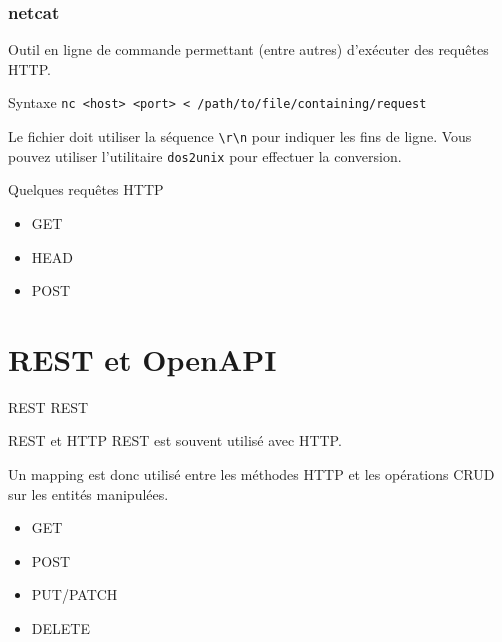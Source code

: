 \documentclass{beamer}
\begin{document}
\begin{frame}[fragile]
  \frametitle{netcat}
  Outil en ligne de commande permettant (entre autres) d'exécuter des requêtes HTTP.

  \begin{alertblock}{Syntaxe}
    \verb+nc <host> <port> < /path/to/file/containing/request+
  \end{alertblock}

  Le fichier doit utiliser la séquence \verb+\r\n+ pour indiquer les fins de ligne. Vous pouvez utiliser l'utilitaire \verb+dos2unix+ pour effectuer la conversion.
\end{frame}

\begin{frame}{Quelques requêtes HTTP}
\begin{itemize}
  \item GET
  \item HEAD
  \item POST
\end{itemize}
\end{frame}

\section{REST et OpenAPI}
\begin{frame}{REST}
REST
\begin{itemize}
\end{itemize}
\end{frame}

\begin{frame}{REST et HTTP}
REST est souvent utilisé avec HTTP.

Un mapping est donc utilisé entre les méthodes HTTP et les opérations CRUD sur les entités manipulées.
\begin{itemize}
  \item GET
  \item POST
  \item PUT/PATCH
  \item DELETE
\end{itemize}
\end{frame}
\end{document}
